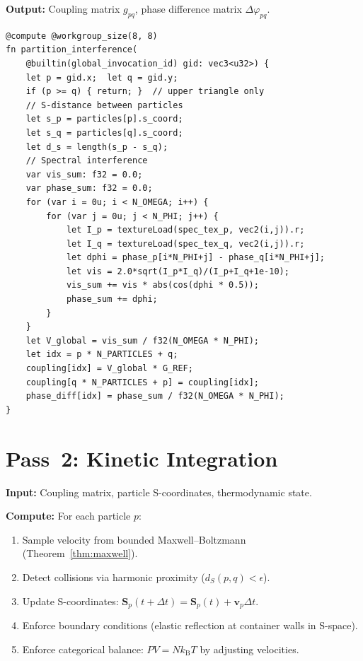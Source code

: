 \documentclass[twocolumn,10pt,a4paper]{article}
\theoremstyle{plain}
\theoremstyle{definition}
\theoremstyle{remark}
\newcommand{\kB}{k_{\mathrm{B}}}
\newcommand{\Scoord}{\mathbf{S}}
\begin{document}
\textbf{Output:} Coupling matrix $g_{pq}$, phase difference matrix $\Delta\varphi_{pq}$.

\begin{lstlisting}[style=wgsl,caption={Pass 1: Partition Interference (WGSL pseudocode)}]
@compute @workgroup_size(8, 8)
fn partition_interference(
    @builtin(global_invocation_id) gid: vec3<u32>) {
    let p = gid.x;  let q = gid.y;
    if (p >= q) { return; }  // upper triangle only
    // S-distance between particles
    let s_p = particles[p].s_coord;
    let s_q = particles[q].s_coord;
    let d_s = length(s_p - s_q);
    // Spectral interference
    var vis_sum: f32 = 0.0;
    var phase_sum: f32 = 0.0;
    for (var i = 0u; i < N_OMEGA; i++) {
        for (var j = 0u; j < N_PHI; j++) {
            let I_p = textureLoad(spec_tex_p, vec2(i,j)).r;
            let I_q = textureLoad(spec_tex_q, vec2(i,j)).r;
            let dphi = phase_p[i*N_PHI+j] - phase_q[i*N_PHI+j];
            let vis = 2.0*sqrt(I_p*I_q)/(I_p+I_q+1e-10);
            vis_sum += vis * abs(cos(dphi * 0.5));
            phase_sum += dphi;
        }
    }
    let V_global = vis_sum / f32(N_OMEGA * N_PHI);
    let idx = p * N_PARTICLES + q;
    coupling[idx] = V_global * G_REF;
    coupling[q * N_PARTICLES + p] = coupling[idx];
    phase_diff[idx] = phase_sum / f32(N_OMEGA * N_PHI);
}
\end{lstlisting}

\section{Pass~2: Kinetic Integration}
\label{sec:pass2}

\textbf{Input:} Coupling matrix, particle S-coordinates, thermodynamic state.

\textbf{Compute:} For each particle $p$:
\begin{enumerate}
    \item Sample velocity from bounded Maxwell--Boltzmann (Theorem~\ref{thm:maxwell}).
    \item Detect collisions via harmonic proximity ($d_S(p, q) < \epsilon$).
    \item Update S-coordinates: $\Scoord_p(t + \Delta t) = \Scoord_p(t) + \mathbf{v}_p \Delta t$.
    \item Enforce boundary conditions (elastic reflection at container walls in S-space).
    \item Enforce categorical balance: $PV = N\kB T$ by adjusting velocities.
\end{enumerate}
\end{document}
